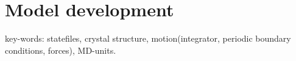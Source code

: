\section{Model development}
key-words: statefiles, crystal structure, motion(integrator, periodic boundary conditions, forces), MD-units.